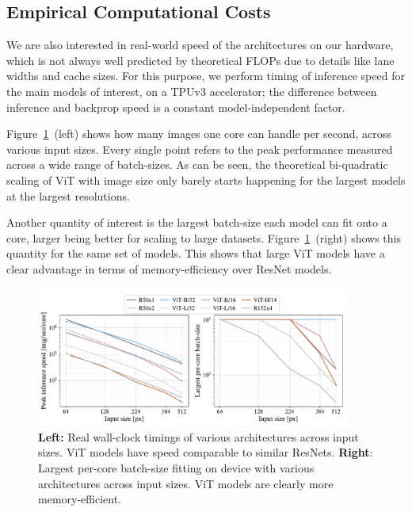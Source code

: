 \subsection{Empirical Computational Costs}
\label{sec:empirical_computation}

We are also interested in real-world speed of the architectures on our hardware, which is not always well predicted by theoretical FLOPs due to details like lane widths and cache sizes.
For this purpose, we perform timing of inference speed for the main models of interest, on a TPUv3 accelerator; the difference between inference and backprop speed is a constant model-independent factor.

Figure~\ref{fig:real_time}~(left) shows how many images one core can handle per second, across various input sizes.
Every single point refers to the peak performance measured across a wide range of batch-sizes.
As can be seen, the theoretical bi-quadratic scaling of ViT with image size only barely starts happening for the largest models at the largest resolutions.

Another quantity of interest is the largest batch-size each model can fit onto a core, larger being better for scaling to large datasets.
Figure~\ref{fig:real_time}~(right) shows this quantity for the same set of models.
This shows that large ViT models have a clear advantage in terms of memory-efficiency over ResNet models.

\begin{figure}[h]
\begin{center}
\includegraphics[width=0.92\textwidth]{images/img_sec_core}
\end{center}
\caption{\textbf{Left:} Real wall-clock timings of various architectures across input sizes. ViT models have speed comparable to similar ResNets.
\textbf{Right}: Largest per-core batch-size fitting on device with various architectures across input sizes. ViT models are clearly more memory-efficient.}
\label{fig:real_time}
\end{figure}

